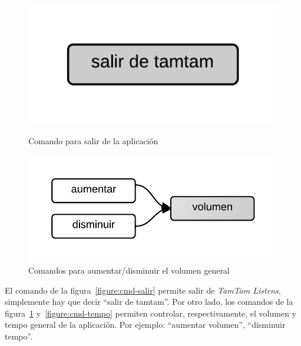 \begin{figure}[H]
\begin{minipage}[b]{0.5\linewidth}
\centering
\includegraphics[width=0.6\linewidth]{./graphics/salir.png}
\caption{Comando para salir de la aplicaci\'on}
\label{figure:cmd-salir}
\end{minipage}
\quad
\begin{minipage}[b]{0.5\linewidth}
\centering
\includegraphics[width=0.6\linewidth]{./graphics/cmd-vol.png}
\caption{Comandos para aumentar/disminuir el volumen general}
\label{figure:cmd-vol}
\end{minipage}
\end{figure}

El comando de la figura~\ref{figure:cmd-salir} permite salir de \emph{TamTam Listens}, simplemente hay que decir ``salir de tamtam''. Por otro lado, los comandos de la figura~\ref{figure:cmd-vol}
y~\ref{figure:cmd-tempo} permiten controlar, respectivamente, el volumen y tempo general de la aplicaci\'on. Por ejemplo: ``aumentar volumen'', ``disminuir tempo''.

